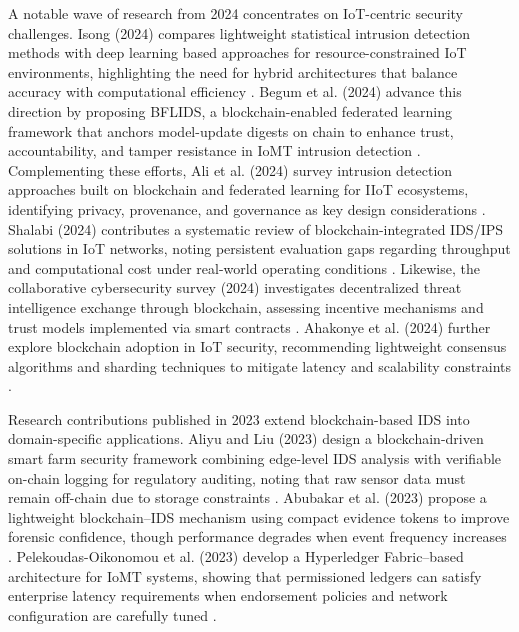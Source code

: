 \documentclass[conference]{IEEEtran}
\begin{document}
A notable wave of research from 2024 concentrates on IoT-centric security challenges. Isong (2024) compares lightweight statistical intrusion detection methods with deep learning based approaches for resource-constrained IoT environments, highlighting the need for hybrid architectures that balance accuracy with computational efficiency \cite{isong2024insights}. Begum et al. (2024) advance this direction by proposing BFLIDS, a blockchain-enabled federated learning framework that anchors model-update digests on chain to enhance trust, accountability, and tamper resistance in IoMT intrusion detection \cite{begum2024bflids}. Complementing these efforts, Ali et al. (2024) survey intrusion detection approaches built on blockchain and federated learning for IIoT ecosystems, identifying privacy, provenance, and governance as key design considerations \cite{ali2024survey}. Shalabi (2024) contributes a systematic review of blockchain-integrated IDS/IPS solutions in IoT networks, noting persistent evaluation gaps regarding throughput and computational cost under real-world operating conditions \cite{shodiya2024slr}. Likewise, the collaborative cybersecurity survey (2024) investigates decentralized threat intelligence exchange through blockchain, assessing incentive mechanisms and trust models implemented via smart contracts \cite{collab2024arxiv}. Ahakonye et al. (2024) further explore blockchain adoption in IoT security, recommending lightweight consensus algorithms and sharding techniques to mitigate latency and scalability constraints \cite{mdpi2024tides}.

Research contributions published in 2023 extend blockchain-based IDS into domain-specific applications. Aliyu and Liu (2023) design a blockchain-driven smart farm security framework combining edge-level IDS analysis with verifiable on-chain logging for regulatory auditing, noting that raw sensor data must remain off-chain due to storage constraints \cite{ali2025smartfarm}. Abubakar et al. (2023) propose a lightweight blockchain--IDS mechanism using compact evidence tokens to improve forensic confidence, though performance degrades when event frequency increases \cite{abubakar2023efficient}. Pelekoudas-Oikonomou et al. (2023) develop a Hyperledger Fabric--based architecture for IoMT systems, showing that permissioned ledgers can satisfy enterprise latency requirements when endorsement policies and network configuration are carefully tuned \cite{pelekoudas2023prototype}.
\end{document}
